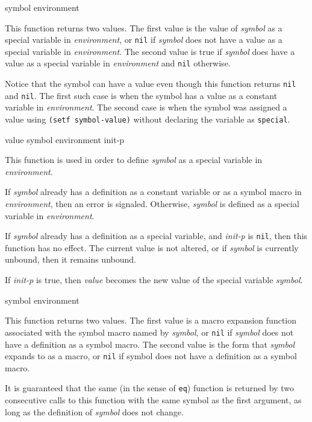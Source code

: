  {symbol environment}

This function returns two values.  The first value is the value of
\textit{symbol} as a special variable in \textit{environment}, or
\texttt{nil} if \textit{symbol} does not have a value as a special
variable in \textit{environment}.  The second value is true if
\textit{symbol} does have a value as a special variable in
\textit{environment} and \texttt{nil} otherwise.

Notice that the symbol can have a value even though this function
returns \texttt{nil} and \texttt{nil}.  The first such case is when
the symbol has a value as a constant variable in \textit{environment}.
The second case is when the symbol was assigned a value using
\texttt{(setf symbol-value)} without declaring the variable as
\texttt{special}.

 {value symbol environment init-p}

This function is used in order to define \textit{symbol} as a special
variable in \textit{environment}.

If \textit{symbol} already has a definition as a constant variable or
as a symbol macro in \textit{environment}, then an error is signaled.
Otherwise, \textit{symbol} is defined as a special variable in
\textit{environment}.

If \textit{symbol} already has a definition as a special variable, and
\textit{init-p} is \texttt{nil}, then this function has no effect.
The current value is not altered, or if \textit{symbol} is currently
unbound, then it remains unbound.

If \textit{init-p} is true, then \textit{value} becomes the new value
of the special variable \textit{symbol}.

 {symbol environment}

This function returns two values.  The first value is a macro
expansion function associated with the symbol macro named by
\textit{symbol}, or \texttt{nil} if \textit{symbol} does not have a
definition as a symbol macro.  The second value is the form that
\textit{symbol} expands to as a macro, or \texttt{nil} if symbol does
not have a definition as a symbol macro.

It is guaranteed that the same (in the sense of \texttt{eq}) function
is returned by two consecutive calls to this function with the same
symbol as the first argument, as long as the definition of
\textit{symbol} does not change.

